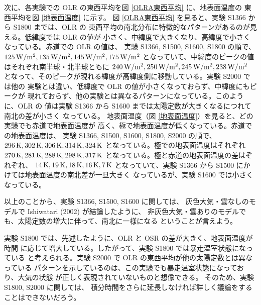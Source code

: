 \documentclass[body]{subfiles}
\begin{document}
\afterpage{\clearpage}
次に、各実験での OLR の東西平均を図 \ref{OLRA東西平均} に、地表面温度の
東西平均を図 \ref{地表面温度} に示す。
図 \ref{OLRA東西平均} を見ると、実験 S1366 から S1800 までは、OLR の
東西平均の南北分布に特徴的なパターンがあるのが見える。低緯度では OLR の値が
小さく、中緯度で大きくなり、高緯度で小さくなっている。赤道での OLR の値は、
実験 S1366, S1500, S1600, S1800 の順で、
\(125\hmu{W/m^2},135\hmu{W/m^2},145\hmu{W/m^2},175\hmu{W/m^2}\)
となっていて、中緯度のピークの値はそれぞれ南半球・北半球ともに
\(240\hmu{W/m^2},250\hmu{W/m^2},245\hmu{W/m^2},238\hmu{W/m^2}\)
となって、そのピークが現れる緯度が高緯度側に移動している。実験 S2000 では他の
実験とは違い、低緯度で OLR の値が小さくなっておらず、中緯度にもピークが
現れておらず、他の実験とは異なるパターンになっている。このように、OLR の
値は実験 S1366 から S1600 までは太陽定数が大きくなるにつれて南北の差が小さく
なっている。
地表面温度（図 \ref{地表面温度}）を見ると、どの実験でも赤道で地表面温度が
高く、極で地表面温度が低くなっている。赤道での地表面温度は、
実験 S1366, S1500, S1600, S1800, S2000 の順で、
\(296\hmu{K},302\hmu{K},306\hmu{K},314\hmu{K},324\hmu{K}\)
となっている。極での地表面温度はそれぞれ
\(270\hmu{K},281\hmu{K},288\hmu{K},298\hmu{K},317\hmu{K}\)
となっている。極と赤道の地表面温度の差はぞれぞれ、
\(14\hmu{K},19\hmu{K},18\hmu{K},16\hmu{K},7\hmu{K}\)
となっていて、実験 S1366 から S1500 にかけては地表面温度の南北差が一旦大きく
なっているが、実験 S1600 では小さくなっている。

以上のことから、実験 S1366, S1500, S1600 に関しては、
灰色大気・雲なしのモデルで Ishiwatari \etal (2002) が結論したように、
非灰色大気・雲ありのモデルでも、太陽定数の増大に伴って、南北に一様になる
ということが言えよう。

実験 S1800 では、先述したように、OLR と OSR の差が大きく、地表面温度が時間
に応じて増大している。したがって、実験 S1800 では暴走温室状態になっている
と考えられる。実験 S2000 で OLR の東西平均が他の太陽定数とは異なっている
パターンを示しているのは、この実験でも暴走温室状態になっており、大気の状態
が正しく表現されていないものと想像できる。
そのため、実験 S1800, S2000 に関しては、
積分時間をさらに延長しなければ詳しく議論をすることはできないだろう。
\end{document}
